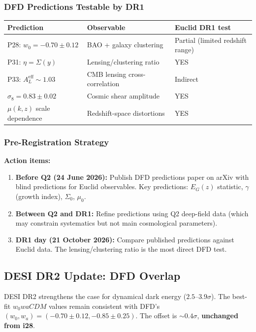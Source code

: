 \documentclass[11pt,a4paper]{article}
\begin{document}
\subsubsection{DFD Predictions Testable by DR1}
\begin{center}
\begin{tabular}{lll}
\toprule
\textbf{Prediction} & \textbf{Observable} & \textbf{Euclid DR1 test} \\
\midrule
P28: $w_0 = -0.70 \pm 0.12$ & BAO + galaxy clustering & Partial (limited redshift range) \\
P31: $\eta = \Sigma(y)$ & Lensing/clustering ratio & YES \\
P33: $A_L^\mathrm{eff} \sim 1.03$ & CMB lensing cross-correlation & Indirect \\
$\sigma_8 = 0.83 \pm 0.02$ & Cosmic shear amplitude & YES \\
$\mu(k,z)$ scale dependence & Redshift-space distortions & YES \\
\bottomrule
\end{tabular}
\end{center}

\subsubsection{Pre-Registration Strategy}

\textbf{Action items:}
\begin{enumerate}
\item \textbf{Before Q2 (24 June 2026):} Publish DFD predictions paper on arXiv with blind predictions for Euclid observables. Key predictions: $E_G(z)$ statistic, $\gamma$ (growth index), $\Sigma_0$, $\mu_0$.
\item \textbf{Between Q2 and DR1:} Refine predictions using Q2 deep-field data (which may constrain systematics but not main cosmological parameters).
\item \textbf{DR1 day (21 October 2026):} Compare published predictions against Euclid data. The lensing/clustering ratio is the most direct DFD test.
\end{enumerate}

\subsection{DESI DR2 Update: DFD Overlap}

DESI DR2 strengthens the case for dynamical dark energy ($2.5$--$3.9\sigma$). The best-fit $w_0waCDM$ values remain consistent with DFD's $(w_0, w_a) = (-0.70 \pm 0.12, -0.85 \pm 0.25)$. The offset is $\sim 0.4\sigma$, \textbf{unchanged from i28}.
\end{document}
